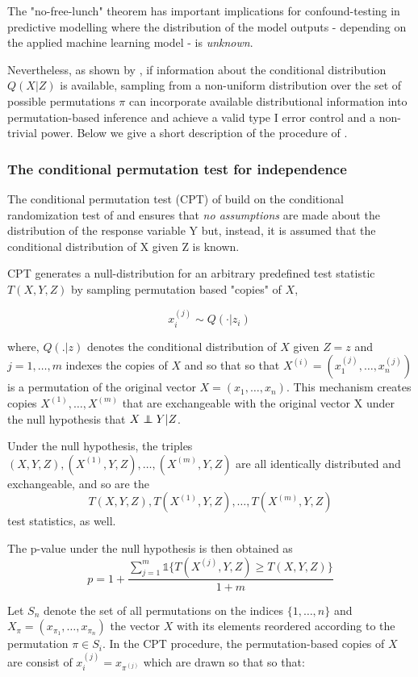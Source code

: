 \documentclass{article}
\begin{document}
The "no-free-lunch" theorem has important implications for confound-testing in predictive modelling where the distribution of the model outputs - depending on the applied machine learning model - is \emph{unknown}.

Nevertheless, as shown by \cite{berrett2020conditional}, if information about the conditional distribution $Q(X|Z)$ is available, sampling from a non-uniform distribution over the set of possible permutations $\pi$ can incorporate available distributional information into permutation-based inference and achieve a valid type I error control and a non-trivial power.
Below we give a short description of the procedure of \cite{berrett2020conditional}.

\subsubsection*{The conditional permutation test for independence}

The conditional permutation test (CPT) of \cite{berrett2020conditional} build on the conditional randomization test of \cite{candes2016panning} and ensures that \emph{no assumptions} are made about the distribution of the response variable Y but, instead, it is assumed that the conditional distribution of X given Z is known.

CPT generates a null-distribution for an arbitrary predefined test statistic $T(X,Y,Z)$ by sampling permutation based "copies" of $X$,

$$x_i^{(j)} \sim Q(\cdot|z_i) \ $$

where, $Q(.|z)$ denotes the conditional distribution of $X$ given $Z=z$ and $j=1,\dots, m$ indexes the copies of $X$ and so that so that $X^{(i)} = (x_1^{(j)}, \dots, x_n^{(j)})$ is a permutation of the original vector $X = (x_1, \dots, x_n)$. This mechanism creates copies $X^{(1)}, \dots ,X^{(m)}$ that are exchangeable with the original vector X under the null hypothesis that $X \independent Y | Z$.

Under the null hypothesis, the triples $(X,Y,Z), (X^{(1)},Y,Z),\dots,(X^{(m)},Y,Z)$ are all identically distributed and exchangeable, and so are the 
$$T(X,Y,Z), T(X^{(1)},Y,Z),\dots,T(X^{(m)},Y,Z)$$
test statistics, as well.

The p-value under the null hypothesis is then obtained as
$$ p= 1+\frac{\sum_{j=1}^m \mathbb{1} \{T(X^{(j)},Y,Z) \geq T(X,Y,Z) \}  }{1+m}$$

Let $S_n$ denote the set of all permutations on the indices $\{1,\dots,n\}$ and $X_\pi = (x_{\pi_1}, \dots, x_{\pi_n})$ the vector $X$ with its elements reordered according to the permutation $\pi \in S_i$.
In the CPT procedure, the permutation-based copies of $X$ are consist of $x_i^{(j)} = x_{\pi^{(j)}}$ which are drawn so that 
so that:
\end{document}
